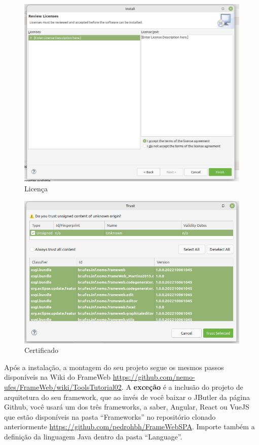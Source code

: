 \documentclass[
article,			%
11pt,				%
oneside,			%
a4paper,			%
english,			%
brazil,				%
sumario=tradicional
]{abntex2}
\begin{document}
\begin{figure}
	\centering
	\includegraphics[width=0.7\linewidth]{figuras/licenca}
	\caption{Licença}
	\label{fig:licenca}
\end{figure}

\begin{figure}
	\centering
	\includegraphics[width=0.7\linewidth]{figuras/certificado}
	\caption{Certificado}
	\label{fig:certificado}
\end{figure}


Após a instalação, a montagem do seu projeto segue os mesmos passos disponíveis na Wiki do FrameWeb \url{https://github.com/nemo-ufes/FrameWeb/wiki/ToolsTutorial02}. A \textbf{exceção} é a inclusão do projeto de arquitetura do seu framework, que ao invés de você baixar o JButler da página Github, você usará um dos três frameworks, a saber, Angular, React ou VueJS que estão disponíveis na pasta ``Frameworks'' no repositório clonado anteriormente \url{https://github.com/pedrohbh/FrameWebSPA}. Importe também a definição da linguagem Java dentro da pasta ``Language''.


\end{document}
